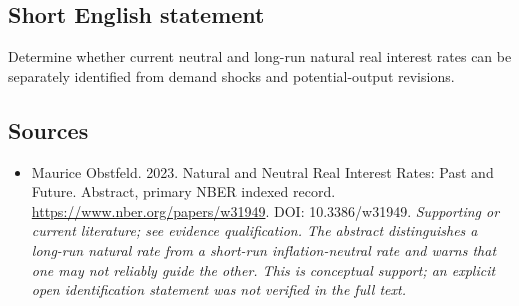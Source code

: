 \documentclass[11pt]{article}
\begin{document}
\subsection{Short English statement}
Determine whether current neutral and long-run natural real interest rates can be separately identified from demand shocks and potential-output revisions.

\subsection{Sources}
\begin{itemize}\raggedright
\item[\textnormal{[S1]}]\hypertarget{source:30007526:1}{} Maurice Obstfeld. 2023. Natural and Neutral Real Interest Rates: Past and Future. Abstract, primary NBER indexed record.
\url{https://www.nber.org/papers/w31949}.
DOI: 10.3386/w31949.
{\small\textit{Supporting or current literature; see evidence qualification. The abstract distinguishes a long-run natural rate from a short-run inflation-neutral rate and warns that one may not reliably guide the other. This is conceptual support; an explicit open identification statement was not verified in the full text.}}
\end{itemize}
\end{document}
